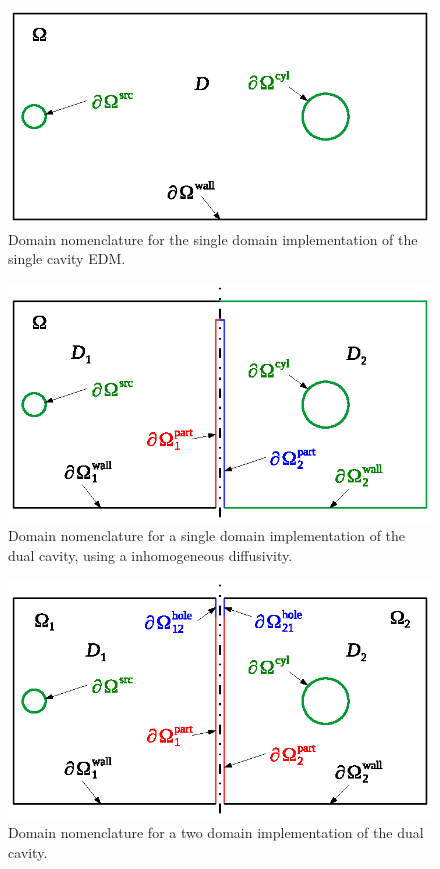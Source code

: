 \documentclass[a4paper]{article}
\numberwithin{equation}{section}
\begin{document}
\begin{figure}[ht]
\begin{center}
\includegraphics[width=0.6\linewidth]{figures/domains0}
\vspace{-4mm}
\caption{\label{fg:tcdom0} Domain nomenclature for the single domain implementation of the single cavity EDM.}
\end{center}
\end{figure}

\begin{figure}[ht]
\begin{center}
\includegraphics[width=0.6\linewidth]{figures/domains1}
\vspace{-4mm}
\caption{\label{fg:tcdom1} Domain nomenclature for a single domain implementation of the dual cavity, using
a inhomogeneous diffusivity.}
\end{center}
\end{figure}

\begin{figure}[ht]
\begin{center}
\includegraphics[width=0.6\linewidth]{figures/domains2}
\vspace{-4mm}
\caption{\label{fg:tcdom2} Domain nomenclature for a two domain implementation of the dual cavity.}
\end{center}
\end{figure}
\end{document}
